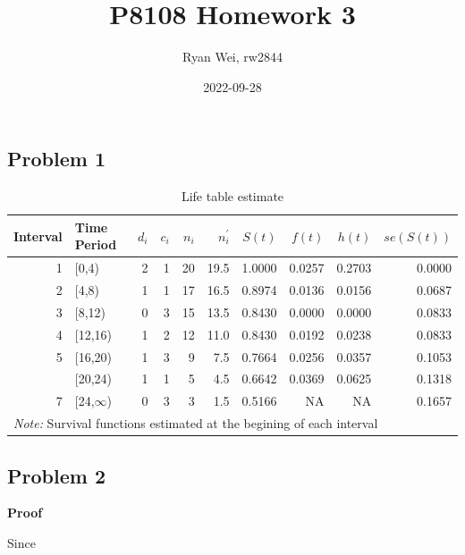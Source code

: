 \documentclass[
]{article}
\title{P8108 Homework 3}
\author{Ryan Wei, rw2844}
\date{2022-09-28}
\begin{document}
\maketitle

\hypertarget{problem-1}{%
\subsection{Problem 1}\label{problem-1}}

\begin{table}[!h]

\caption{\label{tab:hand-draw-lifetable}Life table estimate}
\centering
\begin{tabular}[t]{rlrrrrrrrr}
\toprule
Interval & Time Period & $d_i$ & $c_i$ & $n_i$ & $n_i^{\prime}$ & $S(t)$ & $f(t)$ & $h(t)$ & $se(S(t))$\\
\midrule
1 & {}[0,4) & 2 & 1 & 20 & 19.5 & 1.0000 & 0.0257 & 0.2703 & 0.0000\\
2 & {}[4,8) & 1 & 1 & 17 & 16.5 & 0.8974 & 0.0136 & 0.0156 & 0.0687\\
3 & {}[8,12) & 0 & 3 & 15 & 13.5 & 0.8430 & 0.0000 & 0.0000 & 0.0833\\
4 & {}[12,16) & 1 & 2 & 12 & 11.0 & 0.8430 & 0.0192 & 0.0238 & 0.0833\\
5 & {}[16,20) & 1 & 3 & 9 & 7.5 & 0.7664 & 0.0256 & 0.0357 & 0.1053\\
\addlinespace
6 & {}[20,24) & 1 & 1 & 5 & 4.5 & 0.6642 & 0.0369 & 0.0625 & 0.1318\\
7 & {}[24,$\infty$) & 0 & 3 & 3 & 1.5 & 0.5166 & NA & NA & 0.1657\\
\bottomrule
\multicolumn{10}{l}{\rule{0pt}{1em}\textit{Note: } Survival functions estimated at the begining of each interval}\\
\end{tabular}
\end{table}
\newpage

\hypertarget{problem-2}{%
\subsection{Problem 2}\label{problem-2}}

\textbf{Proof}

Since
\end{document}
